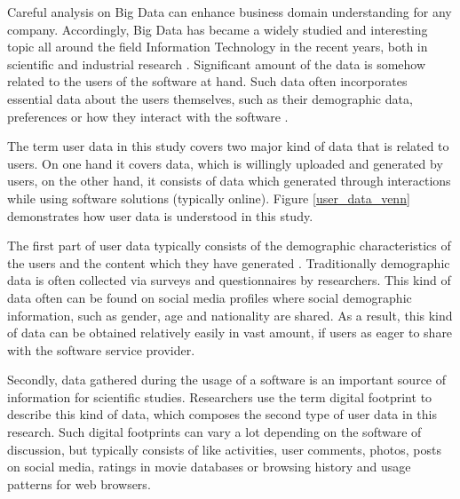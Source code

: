 Careful analysis on Big Data can enhance business domain understanding for any company. Accordingly, Big Data has became a widely studied and interesting topic all around the field Information Technology in the recent years, both in scientific and industrial research \cite{inmon2007tapping, introtodatamining}. Significant amount of the data is somehow related to the users of the software at hand. Such data often incorporates essential data about the users themselves, such as their demographic data, preferences or how they interact with the software 
\cite{jang2015noreciprocity, hu2014we, jang2016teensengagemorewithfewerphotos, han2016teensarefrommars, socialdiversityongithub}.


The term user data in this study covers two major kind of data that is related to users. On one hand it covers data, which is willingly uploaded and generated by users, on the other hand, it consists of data which generated through interactions while using software solutions (typically online). Figure \ref{user_data_venn} demonstrates how user data is understood in this study.

The first part of user data typically consists of the demographic characteristics of the users and the content which they have generated \cite{han2016teensarefrommars}. Traditionally demographic data is often collected via surveys and questionnaires by researchers. This kind of data often can be found on social media profiles where social demographic information, such as gender, age and nationality are shared. As a result, this kind of data can be obtained relatively easily in vast amount, if users as eager to share with the software service provider.

Secondly, data gathered during the usage of a software is an important source of information for scientific studies. Researchers use the term digital footprint \cite{youyou2015computer} to describe this kind of data, which composes the second type of user data in this research. Such digital footprints can vary a lot depending on the software of discussion, but typically consists of like activities, user comments, photos, posts on social media, ratings in movie databases or browsing history and usage patterns for web browsers. 

